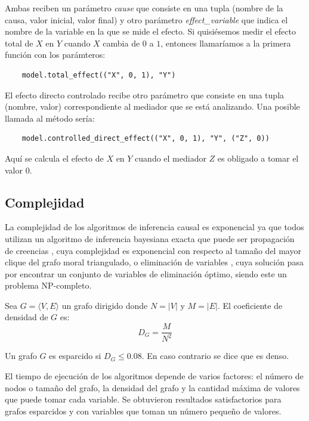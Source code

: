 Ambas reciben un parámetro \textit{cause} que consiste en una tupla (nombre de la causa, valor inicial, valor final) y otro parámetro \textit{effect\_variable} que indica el nombre de la variable en la que se mide el efecto. Si quisiésemos medir el efecto total de $X$ en $Y$ cuando $X$ cambia de $0$ a $1$, entonces llamaríamos a la primera función con los parámteros:
\begin{lstlisting}
	model.total_effect(("X", 0, 1), "Y")
\end{lstlisting}

El efecto directo controlado recibe otro parámetro que consiste en una tupla (nombre, valor) correspondiente al mediador que se está analizando. Una posible llamada al método sería:
\begin{lstlisting}
	model.controlled_direct_effect(("X", 0, 1), "Y", ("Z", 0))
\end{lstlisting}
Aquí se calcula el efecto de $X$ en $Y$ cuando el mediador $Z$ es obligado a tomar el valor $0$.

\subsection{Complejidad}
La complejidad de los algoritmos de inferencia causal es exponencial ya que todos utilizan un algoritmo de inferencia bayesiana exacta que puede ser propagación de creencias \cite{lauritzen1988local}, cuya complejidad es exponencial con respecto al tamaño del mayor clique del grafo moral triangulado, o eliminación de variables \cite{zhang1994simple}, cuya solución pasa por encontrar un conjunto de variables de eliminación óptimo, siendo este un problema NP-completo.

\begin{dfn}
	Sea $G = \langle V, E \rangle$ un grafo dirigido donde $N = |V|$ y $M = |E|$. El coeficiente de densidad de $G$ es:
	\[D_G = \frac{M}{N^2}\]
\end{dfn}

\begin{dfn}
	Un grafo $G$ es esparcido si $D_G \le 0.08$. En caso contrario se dice que es denso.
\end{dfn}

El tiempo de ejecución de los algoritmos depende de varios factores: el número de nodos o tamaño del grafo, la densidad del grafo y la cantidad máxima de valores que puede tomar cada variable. Se obtuvieron resultados satisfactorios para grafos esparcidos y con variables que toman un número pequeño de valores.

